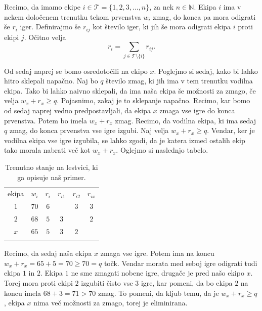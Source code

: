 \documentclass[mat1]{fmfdelo}
\newcommand{\N}{\mathbb N}
\begin{document}
Recimo, da imamo ekipe $i \in \mathcal{T} = \{ 1, 2, 3, \dotsc, n\}$, za nek $n \in \N$. Ekipa $i$ ima v nekem določenem trenutku tekom prvenstva $w_i$ zmag, do konca pa mora odigrati še $r_i$ iger. Definirajmo še $r_{ij}$ kot število iger, ki jih še mora odigrati ekipa $i$ proti ekipi $j$. Očitno velja \[r_i = \sum_{j \in \mathcal{T}\setminus\{i\}} r_{ij}.\]

Od sedaj naprej se bomo osredotočili na ekipo $x$. Poglejmo si sedaj, kako bi lahko hitro sklepali napačno. Naj bo $q$ število zmag, ki jih ima v tem trenutku vodilna ekipa. Tako bi lahko naivno sklepali, da ima naša ekipa še možnosti za zmago, če velja $w_x + r_x \geq q$. Pojasnimo, zakaj je to sklepanje napačno. Recimo, kar bomo od sedaj naprej vedno predpostavljali, da ekipa $x$ zmaga vse igre do konca prvenstva. Potem bo imela $w_x + r_x$ zmag. Recimo, da vodilna ekipa, ki ima sedaj $q$ zmag, do konca prvenstva vse igre izgubi. Naj velja $w_x + r_x \geq q$. Vendar, ker je vodilna ekipa vse igre izgubila, se lahko zgodi, da je katera izmed ostalih ekip tako morala nabrati več kot $w_x + r_x$. Oglejmo si naslednjo tabelo.

\begin{table}[H]
\centering
\caption{Trenutno stanje na lestvici, ki ga opisuje naš primer.}\vspace{3mm}
\begin{tabular}{||c||c|c||c|c|c||}
\hhline{|t:======:t|}
ekipa & $w_i$ & $r_i$ & $r_{i1}$ & $r_{i2}$ & $r_{ix}$\\ \hhline{||=||==||===||}
$1$ & $70$ & $6$ & & $3$ & $3$\\ \hhline{||-||--||---||}
$2$ & $68$ & $5$ & $3$ & & $2$\\ \hhline{||-||--||---||}
$x$ & $65$ & $5$ & $3$ & $2$ & \\ \hhline{|b:======:b|}
\end{tabular}
\end{table}

Recimo, da sedaj naša ekipa $x$ zmaga vse igre. Potem ima na koncu $w_x + r_x = 65+5=70 \geq 70 = q$ točk. Vendar morata med seboj igre odigrati tudi ekipa $1$ in $2$. Ekipa $1$ ne sme zmagati nobene igre, drugače je pred našo ekipo $x$. Torej mora proti ekipi $2$ izgubiti čisto vse $3$ igre, kar pomeni, da bo ekipa $2$ na koncu imela $68+3 = 71 > 70$ zmag. To pomeni, da kljub temu, da je $w_x + r_x \geq q$, ekipa $x$ nima več možnosti za zmago, torej je eliminirana.
\end{document}
